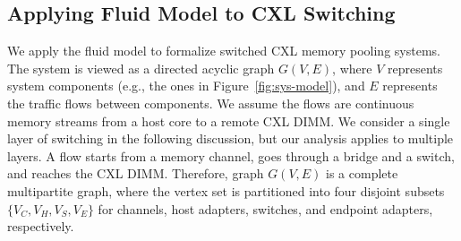 \setlength{\abovedisplayskip}{6pt plus 2pt minus 2pt} %
\setlength{\belowdisplayskip}{6pt plus 2pt minus 2pt} %
\setlength{\abovedisplayshortskip}{6pt plus 2pt minus 2pt} %
\setlength{\belowdisplayshortskip}{6pt plus 2pt minus 2pt} %

\subsection{Applying Fluid Model to CXL Switching}
\label{subsec:proto-fluid}

We apply the fluid model to formalize switched CXL memory pooling systems. The system is viewed as a directed acyclic graph \(G(V, E)\), where \(V\) represents system components (e.g., the ones in Figure~\ref{fig:sys-model}),
and \(E\) represents the traffic flows between components. We assume the flows are continuous memory streams from a host core to a remote CXL DIMM. We consider a single layer of switching in the following discussion, but our analysis applies to multiple layers.
A flow starts from a memory channel, goes through a bridge and a switch, and reaches the CXL DIMM. 
Therefore, graph \(G(V, E)\) is a complete multipartite graph, where the vertex set is partitioned into four disjoint subsets \(\{V_C, V_H, V_S, V_E\}\) for channels, host adapters, switches, and endpoint adapters, respectively.


